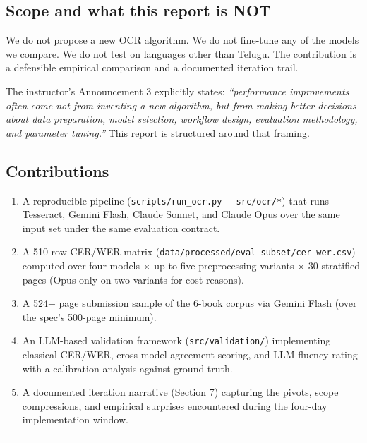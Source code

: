 \documentclass[
  letterpaper,
  DIV=11,
  numbers=noendperiod]{scrartcl}
\providecommand{\tightlist}{%
  \setlength{\itemsep}{0pt}\setlength{\parskip}{0pt}}
\begin{document}
\subsection{Scope and what this report is
NOT}\label{scope-and-what-this-report-is-not}

We do not propose a new OCR algorithm. We do not fine-tune any of the
models we compare. We do not test on languages other than Telugu. The
contribution is a defensible empirical comparison and a documented
iteration trail.

The instructor's Announcement 3 explicitly states: \emph{``performance
improvements often come not from inventing a new algorithm, but from
making better decisions about data preparation, model selection,
workflow design, evaluation methodology, and parameter tuning.''} This
report is structured around that framing.

\subsection{Contributions}\label{contributions}

\begin{enumerate}
\def\labelenumi{\arabic{enumi}.}
\tightlist
\item
  A reproducible pipeline (\texttt{scripts/run\_ocr.py} +
  \texttt{src/ocr/*}) that runs Tesseract, Gemini Flash, Claude Sonnet,
  and Claude Opus over the same input set under the same evaluation
  contract.
\item
  A 510-row CER/WER matrix
  (\texttt{data/processed/eval\_subset/cer\_wer.csv}) computed over four
  models × up to five preprocessing variants × 30 stratified pages (Opus
  only on two variants for cost reasons).
\item
  A 524+ page submission sample of the 6-book corpus via Gemini Flash
  (over the spec's 500-page minimum).
\item
  An LLM-based validation framework (\texttt{src/validation/})
  implementing classical CER/WER, cross-model agreement scoring, and LLM
  fluency rating with a calibration analysis against ground truth.
\item
  A documented iteration narrative (Section 7) capturing the pivots,
  scope compressions, and empirical surprises encountered during the
  four-day implementation window.
\end{enumerate}

\begin{center}\rule{0.5\linewidth}{0.5pt}\end{center}
\end{document}
